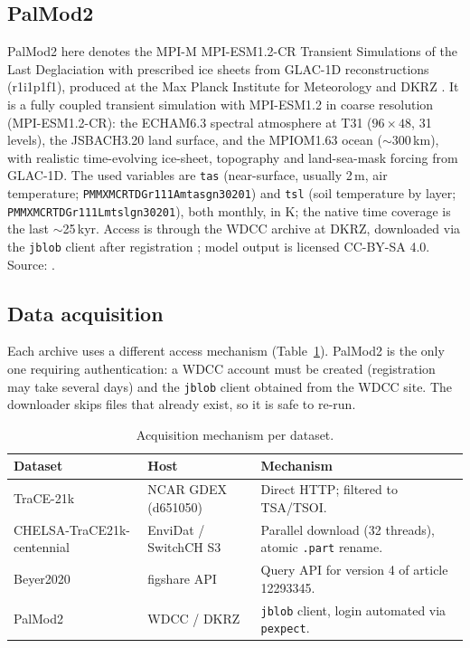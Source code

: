 \documentclass{isprs}
\newcommand{\tabbr}[1]{\texttt{#1}}
\begin{document}
\subsection{PalMod2}
PalMod2 here denotes the MPI-M MPI-ESM1.2-CR Transient Simulations of the Last Deglaciation with prescribed ice sheets from GLAC-1D reconstructions (r1i1p1f1), produced at the Max Planck Institute for Meteorology and DKRZ \cite{palmod2_data}. It is a fully coupled transient simulation with MPI-ESM1.2 in coarse resolution (MPI-ESM1.2-CR): the ECHAM6.3 spectral atmosphere at T31 ($96\times48$, 31 levels), the JSBACH3.20 land surface, and the MPIOM1.63 ocean ($\sim$300\,km), with realistic time-evolving ice-sheet, topography and land-sea-mask forcing from GLAC-1D. The used variables are \tabbr{tas} (near-surface, usually 2\,m, air temperature; \texttt{PMMXMCRTDGr111\allowbreak Amtasgn30201}) and \tabbr{tsl} (soil temperature by layer; \texttt{PMMXMCRTDGr111\allowbreak Lmtslgn30201}), both monthly, in K; the native time coverage is the last $\sim$25\,kyr. Access is through the WDCC archive at DKRZ, downloaded via the \tabbr{jblob} client after registration \cite{wdcc_jblob}; model output is licensed CC-BY-SA 4.0. Source: \cite{palmod2_data}.

\subsection{Data acquisition}
Each archive uses a different access mechanism (Table~\ref{tab:acq}). PalMod2 is the only one requiring authentication: a WDCC account must be created (registration may take several days) and the \tabbr{jblob} client obtained from the WDCC site. The downloader skips files that already exist, so it is safe to re-run.

\begin{table}[t]
\centering
\small
\begin{tabular}{lll}
\toprule
Dataset          			& Host                  & Mechanism \\
\midrule
TraCE-21k        			& NCAR GDEX (d651050)   & Direct HTTP; filtered to TSA/TSOI. \\
CHELSA-TraCE21k-centennial  & EnviDat / SwitchCH S3 & Parallel download (32 threads), atomic \tabbr{.part} rename. \\
Beyer2020   				& figshare API          & Query API for version 4 of article 12293345. \\
PalMod2          			& WDCC / DKRZ           & \tabbr{jblob} client, login automated via \tabbr{pexpect}. \\
\bottomrule
\end{tabular}
\caption{Acquisition mechanism per dataset.}
\label{tab:acq}
\end{table}
\end{document}
